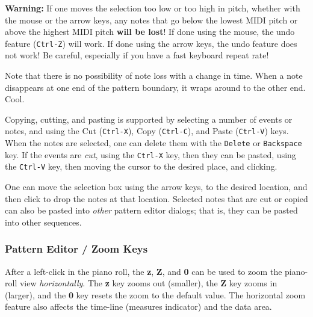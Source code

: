    \textbf{Warning:}
   If one moves the selection too low or too high in pitch, whether with the
   mouse or the arrow keys, any notes that go below the lowest MIDI pitch or
   above the highest MIDI pitch \textbf{will be lost}!
   If done using the mouse, the undo feature (\texttt{Ctrl-Z}) will work.
   If done using the arrow keys, the undo feature does not work!
   Be careful, especially if you have a fast keyboard repeat rate!

   Note that there is no possibility of note loss with a change in time.  When
   a note disappears at one end of the pattern boundary, it wraps around to the
   other end.  Cool.

   Copying, cutting, and pasting is supported by selecting a number of events
   or notes, and using the
    Cut (\texttt{Ctrl-X}), 
    Copy (\texttt{Ctrl-C}), and
    Paste (\texttt{Ctrl-V})
   keys.
   When the notes are selected,
   one can delete them with the \texttt{Delete} or \texttt{Backspace} key.
   If the events are \textsl{cut}, using the \texttt{Ctrl-X} key, then
   they can be pasted, using the \texttt{Ctrl-V} key, then
   moving the cursor to the desired place, and clicking.

   One can move the selection box using the arrow keys, to the
   desired location, and then click to
   drop the notes at that location.
   Selected notes that are cut or copied can also be
   pasted into \textsl{other} pattern editor dialogs; that is, they can be
   pasted into other sequences.

\subsubsection{Pattern Editor / Zoom Keys}
\label{subsubsec:pattern_editor_zoom_keys}

   After a left-click in the piano roll, the
   \textbf{z}, \textbf{Z}, and \textbf{0}
   can be used to zoom the piano-roll view \textsl{horizontally}.
   The \textbf{z} key zooms out (smaller),
   the \textbf{Z} key zooms in (larger),
   and the \textbf{0} key resets the zoom to the default value.
   The horizontal zoom feature also affects the time-line
   (measures indicator) and the data area.

